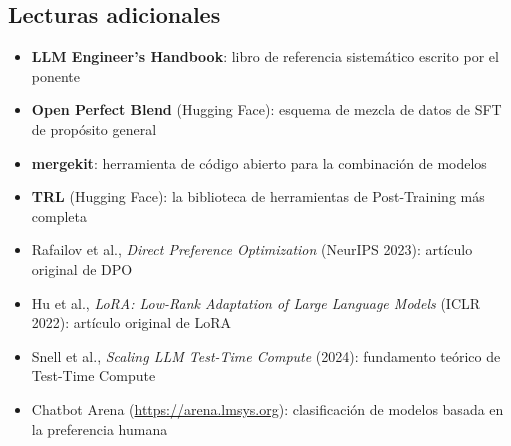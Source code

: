 \documentclass[a4paper]{article}
\begin{document}
\subsection{Lecturas adicionales}

\begin{itemize}
    \item \textbf{LLM Engineer's Handbook}: libro de referencia sistemático escrito por el ponente
    \item \textbf{Open Perfect Blend} (Hugging Face): esquema de mezcla de datos de SFT de propósito general
    \item \textbf{mergekit}: herramienta de código abierto para la combinación de modelos
    \item \textbf{TRL} (Hugging Face): la biblioteca de herramientas de Post-Training más completa
    \item Rafailov et al., \textit{Direct Preference Optimization} (NeurIPS 2023): artículo original de DPO
    \item Hu et al., \textit{LoRA: Low-Rank Adaptation of Large Language Models} (ICLR 2022): artículo original de LoRA
    \item Snell et al., \textit{Scaling LLM Test-Time Compute} (2024): fundamento teórico de Test-Time Compute
    \item Chatbot Arena (\url{https://arena.lmsys.org}): clasificación de modelos basada en la preferencia humana
\end{itemize}

\end{document}
